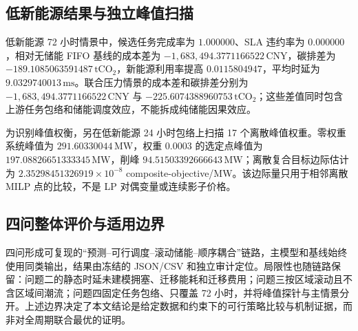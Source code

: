 \subsection{低新能源结果与独立峰值扫描}

低新能源 72 小时情景中，候选任务完成率为 $1.000000$、SLA 违约率为 $0.000000$，相对无储能 FIFO 基线的成本差为 $-1,683,494.3771166522\,\mathrm{CNY}$，碳排差为 $-189.1085063591487\,\mathrm{tCO_2}$，新能源利用率提高 $0.0115804947$，平均时延为 $9.0329740013\,\mathrm{ms}$。联合压力情景的成本差和碳排差分别为 $-1,683,494.3771166522\,\mathrm{CNY}$ 与 $-225.6074388960753\,\mathrm{tCO_2}$；这些差值同时包含上游任务包络和储能调度效应，不能拆成纯储能因果效应。

为识别峰值权衡，另在低新能源 24 小时包络上扫描 17 个离散峰值权重。零权重系统峰值为 $291.60330044\,\mathrm{MW}$，权重 $0.0003$ 的选定点峰值为 $197.08826651333345\,\mathrm{MW}$，削峰 $94.51503392666643\,\mathrm{MW}$；离散复合目标边际估计为 $2.35298451326919\times10^{-8}$ composite-objective/MW。该边际量只用于相邻离散 MILP 点的比较，不是 LP 对偶变量或连续影子价格。

\subsection{四问整体评价与适用边界}

四问形成可复现的“预测--可行调度--滚动储能--顺序耦合”链路，主模型和基线始终使用同类输出，结果由冻结的 JSON/CSV 和独立审计定位。局限性也随链路保留：问题二的静态时延未建模拥塞、迁移能耗和迁移费用；问题三按区域滚动且不含区域间潮流；问题四固定任务包络、只覆盖 72 小时，并将峰值探针与主情景分开。上述边界决定了本文结论是给定数据和约束下的可行策略比较与机制证据，而非对全周期联合最优的证明。
